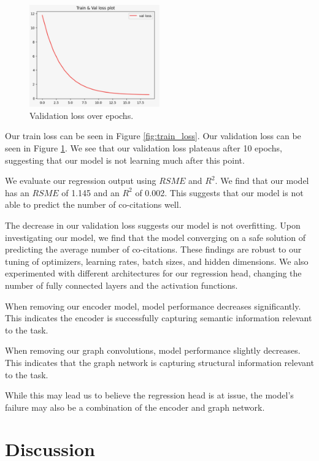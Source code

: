 \documentclass[10pt,twocolumn,letterpaper]{article}
\begin{document}
\begin{figure}
   \centering
   \includegraphics[width=0.5\textwidth]{figures/val-loss.jpeg}
   \caption{Validation loss over epochs.}
   \label{fig:val_loss}
\end{figure}

Our train loss can be seen in Figure \ref{fig:train_loss}. Our validation loss can be seen in Figure \ref{fig:val_loss}. We see that our validation loss plateaus after 10 epochs, suggesting that our model is not learning much after this point.

We evaluate our regression output using $RSME$ and $R^2$. We find that our model has an $RSME$ of 1.145 and an $R^2$ of 0.002. This suggests that our model is not able to predict the number of co-citations well. 

The decrease in our validation loss suggests our model is not overfitting. Upon investigating our model, we find that the model converging on a safe solution of predicting the average number of co-citations. These findings are robust to our tuning of optimizers, learning rates, batch sizes, and hidden dimensions. We also experimented with different architectures for our regression head, changing the number of fully connected layers and the activation functions. 

When removing our encoder model, model performance decreases significantly. This indicates the encoder is successfully capturing semantic information relevant to the task. 

When removing our graph convolutions, model performance slightly decreases. This indicates that the graph network is capturing structural information relevant to the task. 

While this may lead us to believe the regression head is at issue, the model's failure may also be a combination of the encoder and graph network. 


\section{Discussion}
\end{document}
